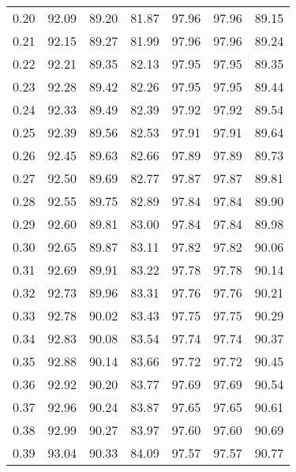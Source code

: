 \begin{tabular}{|c|c|c|c|c|c|c|}
      0.20 &     92.09 &     89.20 &      81.87 &   97.96 &      97.96 &         89.15 \\
      0.21 &     92.15 &     89.27 &      81.99 &   97.96 &      97.96 &         89.24 \\
      0.22 &     92.21 &     89.35 &      82.13 &   97.95 &      97.95 &         89.35 \\
      0.23 &     92.28 &     89.42 &      82.26 &   97.95 &      97.95 &         89.44 \\
      0.24 &     92.33 &     89.49 &      82.39 &   97.92 &      97.92 &         89.54 \\
      0.25 &     92.39 &     89.56 &      82.53 &   97.91 &      97.91 &         89.64 \\
      0.26 &     92.45 &     89.63 &      82.66 &   97.89 &      97.89 &         89.73 \\
      0.27 &     92.50 &     89.69 &      82.77 &   97.87 &      97.87 &         89.81 \\
      0.28 &     92.55 &     89.75 &      82.89 &   97.84 &      97.84 &         89.90 \\
      0.29 &     92.60 &     89.81 &      83.00 &   97.84 &      97.84 &         89.98 \\
      0.30 &     92.65 &     89.87 &      83.11 &   97.82 &      97.82 &         90.06 \\
      0.31 &     92.69 &     89.91 &      83.22 &   97.78 &      97.78 &         90.14 \\
      0.32 &     92.73 &     89.96 &      83.31 &   97.76 &      97.76 &         90.21 \\
      0.33 &     92.78 &     90.02 &      83.43 &   97.75 &      97.75 &         90.29 \\
      0.34 &     92.83 &     90.08 &      83.54 &   97.74 &      97.74 &         90.37 \\
      0.35 &     92.88 &     90.14 &      83.66 &   97.72 &      97.72 &         90.45 \\
      0.36 &     92.92 &     90.20 &      83.77 &   97.69 &      97.69 &         90.54 \\
      0.37 &     92.96 &     90.24 &      83.87 &   97.65 &      97.65 &         90.61 \\
      0.38 &     92.99 &     90.27 &      83.97 &   97.60 &      97.60 &         90.69 \\
      0.39 &     93.04 &     90.33 &      84.09 &   97.57 &      97.57 &         90.77 \\

\end{tabular}
